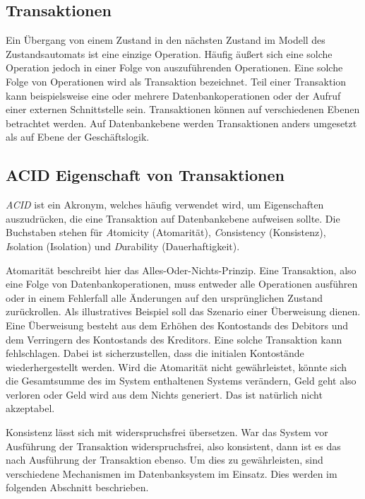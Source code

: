 \subsection{Transaktionen}
Ein Übergang von einem Zustand in den nächsten Zustand im Modell des Zustandsautomats ist eine einzige Operation. Häufig äußert sich eine solche Operation jedoch in einer Folge von auszuführenden Operationen. Eine solche Folge von Operationen wird als Transaktion bezeichnet. Teil einer Transaktion kann beispielsweise eine oder mehrere Datenbankoperationen oder der Aufruf einer externen Schnittstelle sein. Transaktionen können auf verschiedenen Ebenen betrachtet werden. Auf Datenbankebene werden Transaktionen anders umgesetzt als auf Ebene der Geschäftslogik. 

\subsection{ACID Eigenschaft von Transaktionen}
\textit{ACID} ist ein Akronym, welches häufig verwendet wird, um Eigenschaften auszudrücken, die eine Transaktion auf Datenbankebene aufweisen sollte. Die Buchstaben stehen für \textit{A}tomicity (Atomarität), \textit{C}onsistency (Konsistenz), \textit{I}solation (Isolation) und \textit{D}urability (Dauerhaftigkeit). 

\par Atomarität beschreibt hier das Alles-Oder-Nichts-Prinzip. Eine Transaktion, also eine Folge von Datenbankoperationen, muss entweder alle Operationen ausführen oder in einem Fehlerfall alle Änderungen auf den ursprünglichen Zustand zurückrollen. Als illustratives Beispiel soll das Szenario einer Überweisung dienen. Eine Überweisung besteht aus dem Erhöhen des Kontostands des Debitors und dem Verringern des Kontostands des Kreditors. Eine solche Transaktion kann fehlschlagen. Dabei ist sicherzustellen, dass die initialen Kontostände wiederhergestellt werden. Wird die Atomarität nicht gewährleistet, könnte sich die Gesamtsumme des im System enthaltenen Systems verändern, Geld geht also verloren oder Geld wird aus dem Nichts generiert. Das ist natürlich nicht akzeptabel. 

\par Konsistenz lässt sich mit widerspruchsfrei übersetzen. War das System vor Ausführung der Transaktion widerspruchsfrei, also konsistent, dann ist es das nach Ausführung der Transaktion ebenso. Um dies zu gewährleisten, sind verschiedene Mechanismen im Datenbanksystem im Einsatz. Dies werden im folgenden Abschnitt beschrieben.

